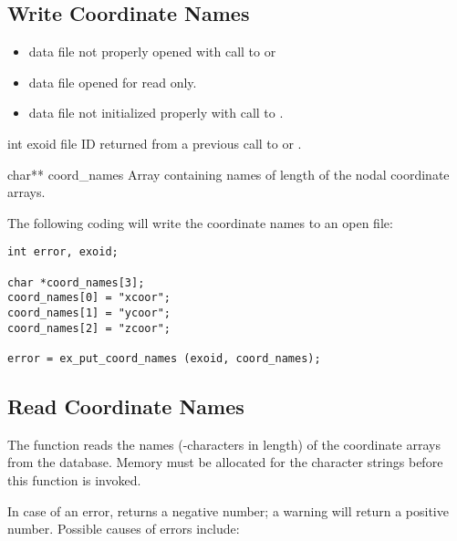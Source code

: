 \subsection{Write Coordinate Names}

\begin{itemize}
 \item data file not properly opened with call to 
 or 

 \item data file opened for read only.

 \item data file not initialized properly with call to
 .
\end{itemize}


\begin{parameters}
\item[{int exoid \R{}}]
\exo{} file ID returned from a previous call to 
or .

\item[{char** coord_names \R{}}]
Array containing  names of length 
of the nodal coordinate arrays.
\end{parameters}

The following coding will write the coordinate names to an
open \exo{} file:

\begin{lstlisting}
int error, exoid;

char *coord_names[3];
coord_names[0] = "xcoor";
coord_names[1] = "ycoor";
coord_names[2] = "zcoor";

error = ex_put_coord_names (exoid, coord_names);
\end{lstlisting}

\subsection{Read Coordinate Names}

The function  reads the names
(-characters in length) of the coordinate arrays
from the database. Memory must be allocated for the character strings
before this function is invoked.


In case of an error,  returns
a negative number; a warning will return a positive number.
Possible causes of errors include:


